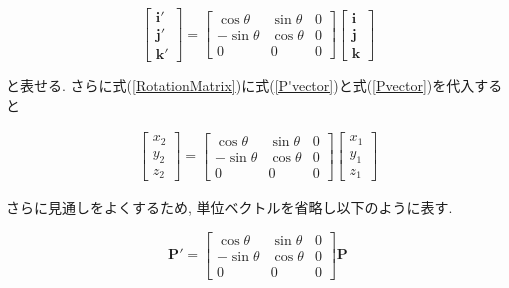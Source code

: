 \documentclass{suribt}
\begin{document}
\begin{equation}
	\label{RotationMatrix}
	\left[
		\begin{array}{c}
			{\bm i'} \\
			{\bm j'} \\
			{\bm k'}
		\end{array}
	\right]
	=
	\left[
		\begin{array}{ccc}
			\cos \theta & \sin \theta & 0 \\
			-\sin \theta & \cos \theta & 0 \\
			0                & 0                 & 0
		\end{array}
	\right]
	\left[
		\begin{array}{c}
			{\bm i} \\
			{\bm j} \\
			{\bm k}
		\end{array}
	\right]
\end{equation}

と表せる. さらに式(\ref{RotationMatrix})に式(\ref{P'vector})と式(\ref{Pvector})を代入すると

\begin{eqnarray*}
	\left[
		\begin{array}{c}
			x_2 \\
			y_2 \\
			z_2
		\end{array}
	\right]
	=
	\left[
		\begin{array}{ccc}
			\cos \theta & \sin \theta & 0 \\
			-\sin \theta & \cos \theta & 0 \\
			0                & 0                 & 0
		\end{array}
	\right]
	\left[
		\begin{array}{c}
			x_1 \\
			y_1 \\
			z_1
		\end{array}
	\right]
\end{eqnarray*}

さらに見通しをよくするため, 単位ベクトルを省略し以下のように表す.


\begin{equation}
	\label{P-P'RotationMatrix}
	{\bm P'}
	=
	\left[
		\begin{array}{ccc}
			\cos \theta & \sin \theta & 0 \\
			-\sin \theta & \cos \theta & 0 \\
			0                & 0                 & 0
		\end{array}
	\right]
	{\bm P}
\end{equation}
\end{document}
